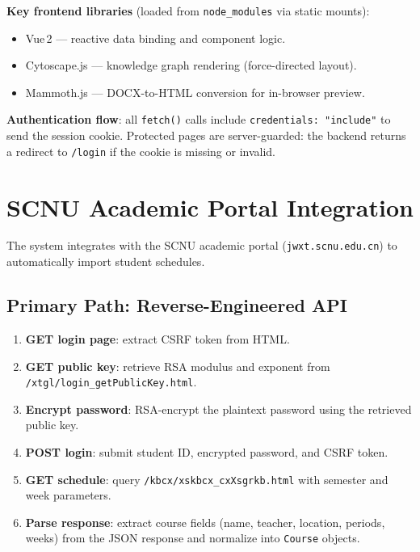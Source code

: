 \documentclass[12pt,a4paper]{article}
\begin{document}
\textbf{Key frontend libraries} (loaded from \texttt{node\_modules} via static mounts):
\begin{itemize}[nosep]
    \item Vue\,2 --- reactive data binding and component logic.
    \item Cytoscape.js --- knowledge graph rendering (force-directed layout).
    \item Mammoth.js --- DOCX-to-HTML conversion for in-browser preview.
\end{itemize}

\textbf{Authentication flow}: all \texttt{fetch()} calls include \texttt{credentials: "include"} to send the session cookie. Protected pages are server-guarded: the backend returns a redirect to \texttt{/login} if the cookie is missing or invalid.

\section{SCNU Academic Portal Integration}
\label{sec:scnu}

The system integrates with the SCNU academic portal (\texttt{jwxt.scnu.edu.cn}) to automatically import student schedules.

\subsection{Primary Path: Reverse-Engineered API}

\begin{enumerate}[nosep]
    \item \textbf{GET login page}: extract CSRF token from HTML.
    \item \textbf{GET public key}: retrieve RSA modulus and exponent from \texttt{/xtgl/login\_getPublicKey.html}.
    \item \textbf{Encrypt password}: RSA-encrypt the plaintext password using the retrieved public key.
    \item \textbf{POST login}: submit student ID, encrypted password, and CSRF token.
    \item \textbf{GET schedule}: query \texttt{/kbcx/xskbcx\_cxXsgrkb.html} with semester and week parameters.
    \item \textbf{Parse response}: extract course fields (name, teacher, location, periods, weeks) from the JSON response and normalize into \texttt{Course} objects.
\end{enumerate}
\end{document}
